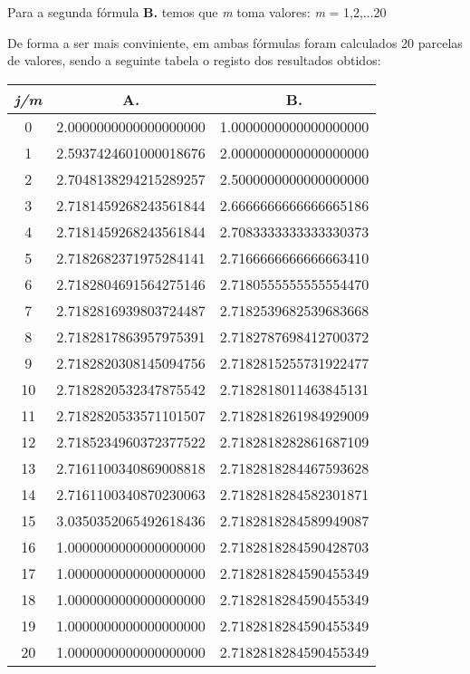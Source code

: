 \documentclass[12pt, letterpaper]{article}
\begin{document}
Para a segunda fórmula \textbf{B.} temos que \textit{m} toma valores: \textit{m} = 1,2,...20 
\newline

De forma a ser mais conviniente, em ambas fórmulas foram calculados 20 parcelas de valores, sendo a seguinte tabela o registo dos resultados obtidos:

\begin{center}
    \begin{tabular}{|| c|c|c ||} \hline
        \textit{j/m} & \textbf{A}. & \textbf{B}. \\ [0.4ex] \hline \hline
         0 & 2.0000000000000000000 & 1.0000000000000000000\\ \hline
         1 & 2.5937424601000018676 & 2.0000000000000000000\\ \hline
         2 & 2.7048138294215289257 & 2.5000000000000000000\\ \hline
         3 & 2.7181459268243561844 & 2.6666666666666665186\\ \hline
         4 & 2.7181459268243561844 & 2.7083333333333330373\\ \hline
         5 & 2.7182682371975284141 & 2.7166666666666663410\\ \hline
         6 & 2.7182804691564275146 & 2.7180555555555554470\\ \hline
         7 & 2.7182816939803724487 & 2.7182539682539683668\\ \hline
         8 & 2.7182817863957975391 & 2.7182787698412700372\\ \hline
         9 & 2.7182820308145094756 & 2.7182815255731922477\\ \hline
         10 & 2.7182820532347875542 & 2.7182818011463845131\\ \hline
         11 & 2.7182820533571101507 & 2.7182818261984929009\\ \hline
         12 & 2.7185234960372377522 & 2.7182818282861687109\\ \hline
         13 & 2.7161100340869008818 & 2.7182818284467593628\\ \hline
         14 & 2.7161100340870230063 & 2.7182818284582301871\\ \hline
         15 & 3.0350352065492618436 & 2.7182818284589949087\\ \hline
         16 & 1.0000000000000000000 & 2.7182818284590428703\\ \hline
         17 & 1.0000000000000000000 & 2.7182818284590455349\\ \hline
         18 & 1.0000000000000000000 & 2.7182818284590455349\\ \hline
         19 & 1.0000000000000000000 & 2.7182818284590455349\\ \hline
         20 & 1.0000000000000000000 & 2.7182818284590455349\\ [0.4ex] \hline
    \end{tabular}
\end{center}
\end{document}
